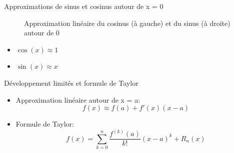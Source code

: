 \documentclass[xcolor=table]{beamer}
\begin{document}
\begin{frame}{Approximations de sinus et cosinus autour de x = 0}
\begin{figure}[ht]
\caption{Approximation linéaire du cosinus (à gauche) et du sinus (à droite) autour de $0$}
    \label{fig:dl}
\end{figure}

\begin{tcolorbox}
    \begin{itemize}
        \item $\cos(x) \approx 1$
        \item $\sin(x) \approx x$
    \end{itemize}
\end{tcolorbox}

\end{frame}

\begin{frame}{Développement limités et formule de Taylor}
    \begin{itemize}
        \item Approximation linéaire autour de x = a:
    \[ f(x) \approx f(a) + f'(x)(x-a) \]
    
        \item Formule de Taylor: \[f(x) = \sum_{k=0}^{n} \frac{f^{(k)}(a)}{k!}(x-a)^k + R_n(x) \]
    \end{itemize}
    
\end{frame}
\end{document}
